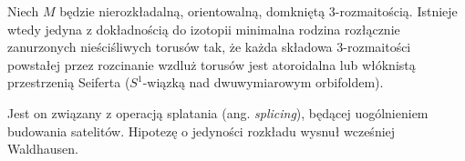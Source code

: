 \begin{proposition}
    Niech $M$ będzie nierozkładalną, orientowalną, domkniętą 3-rozmaitością.
    Istnieje wtedy jedyna z dokładnością do izotopii minimalna rodzina rozłącznie zanurzonych nieściśliwych torusów tak, że każda składowa 3-rozmaitości powstałej przez rozcinanie wzdluż torusów jest atoroidalna lub włóknistą przestrzenią Seiferta ($S^1$-wiązką nad dwuwymiarowym orbifoldem).
\end{proposition}

Jest on związany z operacją splatania (ang. \emph{splicing}), będącej uogólnieniem budowania satelitów.
Hipotezę o jedyności rozkładu wysnuł wcześniej Waldhausen.

